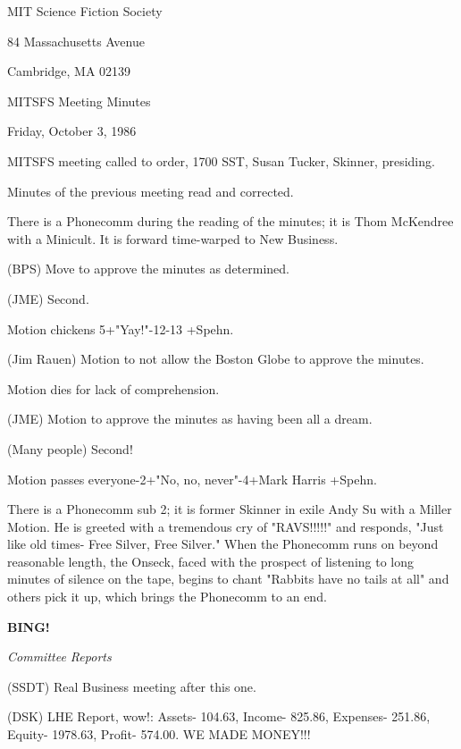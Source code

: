 \documentclass[12pt]{article}
\newcommand{\bing}{{\bf BING!} }
\newcommand{\goto}[1]{\bing \vskip 12pt \centerline{{\em{#1}}}}
\begin{document}
\begin{center}

MIT Science Fiction Society 

84 Massachusetts Avenue

Cambridge, MA 02139

\vspace{12pt}

MITSFS Meeting Minutes 

Friday, October 3, 1986

\end{center}
 
\vspace{18pt}

\setlength{\parskip}{6pt}

\noindent
MITSFS meeting called to order, 1700 SST,
Susan Tucker, Skinner, presiding.

Minutes of the previous meeting read and corrected.

There is a Phonecomm during the reading of the minutes; it is Thom McKendree with a Minicult. It is forward time-warped to New Business.

(BPS) Move to approve the minutes as determined.

(JME) Second.

Motion chickens 5+"Yay!"-12-13 +Spehn.

(Jim Rauen) Motion to not allow the Boston Globe to approve the minutes.

Motion dies for lack of comprehension.

(JME) Motion to approve the minutes as having been all a dream.

(Many people) Second!

Motion passes everyone-2+"No, no, never"-4+Mark Harris +Spehn.

There is a Phonecomm sub 2; it is former Skinner in exile Andy Su with a Miller Motion. He is greeted with a tremendous cry of "RAVS!!!!!" and responds, "Just like old times- Free Silver, Free Silver." When the Phonecomm runs on beyond reasonable length, the Onseck, faced with the prospect of listening to long minutes of silence on the tape, begins to chant "Rabbits have no tails at all" and others pick it up, which brings the Phonecomm to an end.

\goto{Committee Reports}

(SSDT) Real Business meeting after this one.

(DSK) LHE Report, wow!: Assets- 104.63, Income- 825.86, Expenses- 251.86, Equity- 1978.63, Profit- 574.00. WE MADE MONEY!!!
\end{document}
